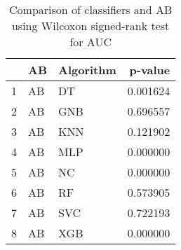 \begin{table}
\footnotesize
\caption{Comparison of classifiers and AB using Wilcoxon signed-rank test for AUC}
\label{tab:AB wilcoxon AUC comparison}
\begin{tabular}{lllr}
\hline
 & AB & Algorithm & p-value \\
\hline
1 & AB & DT & 0.001624 \\
2 & AB & GNB & 0.696557 \\
3 & AB & KNN & 0.121902 \\
4 & AB & MLP & 0.000000 \\
5 & AB & NC & 0.000000 \\
6 & AB & RF & 0.573905 \\
7 & AB & SVC & 0.722193 \\
8 & AB & XGB & 0.000000 \\
\hline
\end{tabular}
\end{table}
